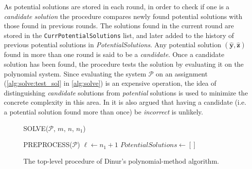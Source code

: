 As potential solutions are stored in each round, in order to check if one is a \textit{candidate solution} the procedure compares newly found potential solutions with those found in previous rounds. The solutions found in the current round are stored in the \texttt{CurrPotentialSolutions} list, and later added to the history of previous potential solutions in \textit{PotentialSolutions}. Any potential solution $(\hat{\mathbf{y}}, \hat{\mathbf{z}})$ found in more than one round is said to be a \textit{candidate}. Once a candidate solution has been found, the procedure tests the solution by evaluating it on the polynomial system. Since evaluating the system $\mathcal{P}$ on an assignment (\cref{alg:solve:test_sol} in \cref{alg:solve}) is an expensive operation, the idea of distinguishing \textit{candidate} solutions from \textit{potential} solutions is used to minimize the concrete complexity in this area. In \cite{eurocrypt-2021-30841} it is also argued that having a candidate (i.e. a potential solution found more than once) be \textit{incorrect} is unlikely.
\begin{figure}[ht]
    \centering
    \begin{alg}
        \caption{SOLVE($\mathcal{P}$, $m$, $n$, $n_1$)}
        \label{alg:solve}
         \label{alg:solve:matrix}
        PREPROCESS($\mathcal{P}$)\; \label{alg:solve:preprocess}
        $\ell \gets n_1 + 1$\;
        $PotentialSolutions \gets []$\;
    \end{alg}
    \caption{The top-level procedure of Dinur's polynomial-method algorithm.}
\end{figure}

